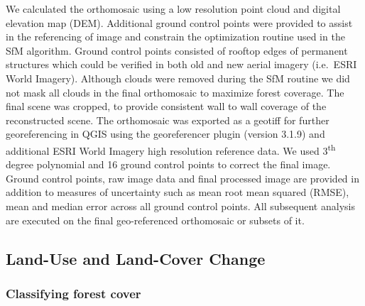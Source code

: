 \documentclass[remote sensing,article,submit,moreauthors,pdftex,10pt,a4paper]{mdpi}
\begin{document}
We calculated the orthomosaic using a low resolution point cloud and
digital elevation map (DEM). Additional ground control points were
provided to assist in the referencing of image and constrain the
optimization routine used in the SfM algorithm. Ground control points
consisted of rooftop edges of permanent structures which could be
verified in both old and new aerial imagery (i.e.~ESRI World Imagery).
Although clouds were removed during the SfM routine we did not mask all
clouds in the final orthomosaic to maximize forest coverage. The final
scene was cropped, to provide consistent wall to wall coverage of the
reconstructed scene. The orthomosaic was exported as a geotiff for
further georeferencing in QGIS \citep{qgisdevelopmentteam2018} using the
georeferencer plugin (version 3.1.9) and additional ESRI World Imagery
high resolution reference data. We used 3\textsuperscript{th} degree
polynomial and 16 ground control points to correct the final image.
Ground control points, raw image data and final processed image are
provided in addition to measures of uncertainty such as mean root mean
squared (RMSE), mean and median error across all ground control points.
All subsequent analysis are executed on the final geo-referenced
orthomosaic or subsets of it.

\hypertarget{land-use-and-land-cover-change}{%
\subsection{Land-Use and Land-Cover
Change}\label{land-use-and-land-cover-change}}

\hypertarget{classifying-forest-cover}{%
\subsubsection{Classifying forest
cover}\label{classifying-forest-cover}}
\end{document}

